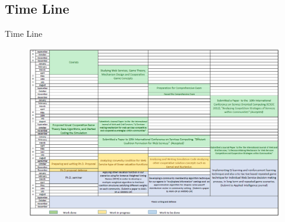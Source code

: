 \documentclass{beamer}
\begin{document}
\subsection{Time Line}
    \begin{frame}{Time Line}


\begin{figure}[htbp]
\begin{center}
\includegraphics[width=1 \columnwidth]{figures/timetable.png}
\end{center}
\end{figure}
    \end{frame}
\end{document}
